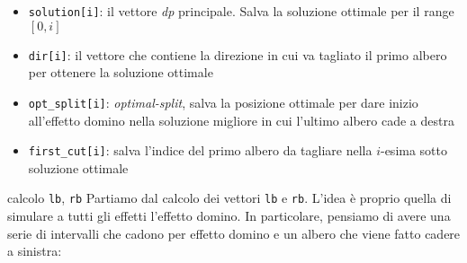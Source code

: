 



\begin{itemize}
	\item \verb|solution[i]|: il vettore \textit{dp} principale. Salva la soluzione ottimale per il range $ \left[0,i\right] $
	\item \verb|dir[i]|: il vettore che contiene la direzione in cui va tagliato il primo albero per ottenere la soluzione ottimale
	\item \verb|opt_split[i]|: \textit{optimal-split}, salva la posizione ottimale per dare inizio all'effetto domino nella soluzione migliore in cui l'ultimo albero cade a destra
	\item \verb|first_cut[i]|: salva l'indice del primo albero da tagliare nella $ i $-esima sotto soluzione ottimale
\end{itemize}
\hypertarget{taglialegna step 1}{} calcolo \verb|lb|, \verb|rb|
\vskip3mm
Partiamo dal calcolo dei vettori \verb|lb| e \verb|rb|. L'idea è proprio quella di simulare a tutti gli effetti l'effetto domino. In particolare, pensiamo di avere una serie di intervalli che cadono per effetto domino e un albero che viene fatto cadere a sinistra:

